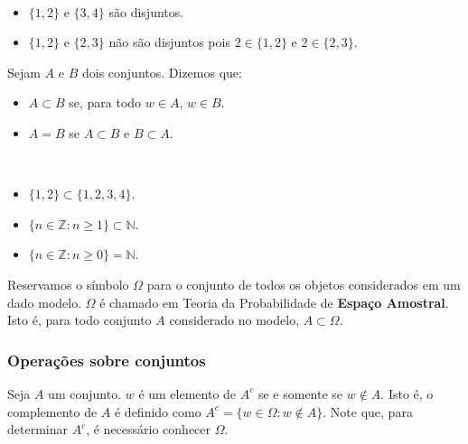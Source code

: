   \begin{example} \
    \begin{itemize}
      \item $\{1,2\}$ e $\{3,4\}$ são disjuntos.
      \item $\{1,2\}$ e $\{2,3\}$ não são disjuntos pois $2 \in \{1,2\}$ e $2 \in \{2,3\}$.
    \end{itemize}
  \end{example}

  \begin{definition}[$\subset$ e $=$] Sejam $A$ e $B$ dois conjuntos. Dizemos que:
    \label{subset}
    \begin{itemize}
      \item $A \subset B$ se, para todo $w \in A$, $w \in B$.
      \item $A = B$ se $A \subset B$ e $B \subset A$.
    \end{itemize}
  \end{definition}

  \begin{example}[$\subset$ e $=$] \
    \begin{itemize}
      \item $\{1,2\} \subset \{1,2,3,4\}$.
      \item $\{n \in \mathbb{Z}: n \geq 1\} \subset \mathbb{N}$.
      \item $\{n \in \mathbb{Z}: n \geq 0\} = \mathbb{N}$.
    \end{itemize}
  \end{example}

  Reservamos o símbolo $\Omega$ para o conjunto de todos os objetos considerados em um dado modelo.
	$\Omega$ é chamado em Teoria da Probabilidade de \textbf{Espaço Amostral}.
	Isto é, para todo conjunto $A$ considerado no modelo, $A \subset \Omega$.
	
  \subsubsection{Operações sobre conjuntos}
  
  \begin{definition}[complemento - $^{c}$]
    \label{complement}
    Seja $A$ um conjunto. $w$ é um elemento de $A^{c}$ se e somente se $w \notin A$. 
		Isto é, o complemento de $A$ é definido como $A^{c} = \{w \in \Omega: w \notin A\}$.
		Note que, para determinar $A^{c}$, é necessário conhecer $\Omega$.
  \end{definition}
  
